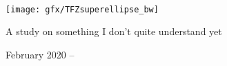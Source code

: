 
\begin{titlepage}

\begin{addmargin}[-1cm]{-3cm}
\begin{center}
\large

\hfill
\vfill

\begingroup
\color{Maroon} \\ \bigskip %
\endgroup


\vfill

\texttt{[image: gfx/TFZsuperellipse\_bw]} \\ \medskip %

A study on something I don't quite understand yet \\ \medskip %

February 2020 -- \myVersion %

\vfill

\end{center}
\end{addmargin}

\end{titlepage}